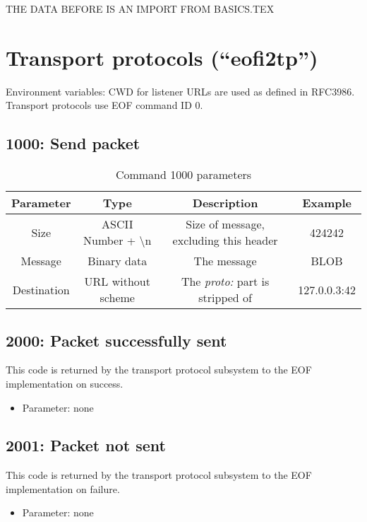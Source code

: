 \documentclass[12pt,a4paper]{book}
\begin{document}
THE DATA BEFORE IS AN IMPORT FROM BASICS.TEX

\section{Transport protocols ("`eofi2tp"')}
Environment variables: CWD for listener
URLs are used as defined in RFC3986\cite{uri-1}.
Transport protocols use EOF command ID 0.
\subsection{1000: Send packet}
\begin{longtable}{|c|c|c|c|}
\caption{Command 1000 parameters}\\
\hline
\textbf{Parameter} & \textbf{Type} & \textbf{Description} & \textbf{Example}\\
\hline
Size & ASCII Number + \textbackslash{}n & Size of message, excluding this header & 424242\\
\hline
Message & Binary data & The message & BLOB\\
\hline
Destination & URL without scheme & The \emph{proto:} part is stripped of & 127.0.0.3:42\\
\hline
\end{longtable}
\subsection{2000: Packet successfully sent}
This code is returned by the transport protocol subsystem to the
EOF implementation on success.
\begin{itemize}
\item Parameter: none
\end{itemize}
\subsection{2001: Packet not sent}
This code is returned by the transport protocol subsystem to the
EOF implementation on failure.
\begin{itemize}
\item Parameter: none
\end{itemize}
\end{document}
